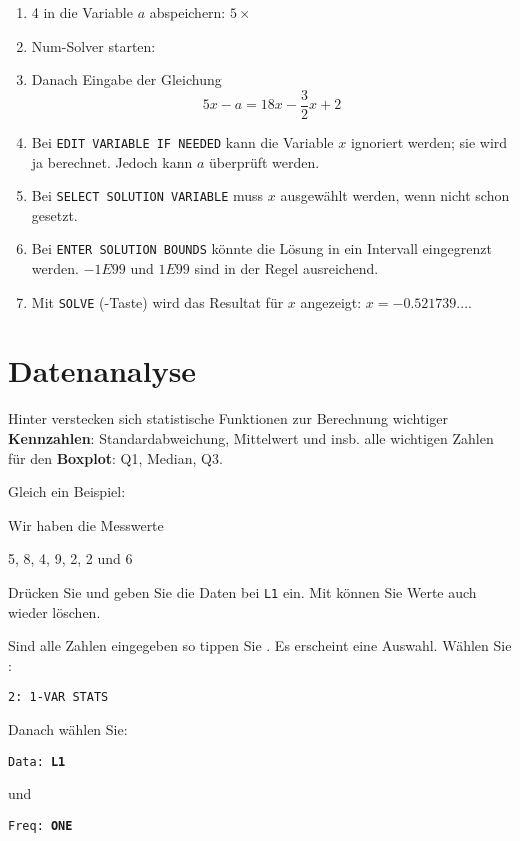 \begin{enumerate}
\item 4 in die Variable $a$ abspeichern:   $5\times$
\item Num-Solver starten:  
\item Danach Eingabe der Gleichung
$$5x-a = 18x -\frac32x + 2$$
\item Bei \texttt{EDIT VARIABLE IF NEEDED} kann die Variable $x$ ignoriert werden; sie wird ja berechnet. Jedoch kann $a$ überprüft werden.
\item Bei \texttt{SELECT SOLUTION VARIABLE} muss $x$ ausgewählt werden, wenn nicht schon gesetzt.
\item Bei \texttt{ENTER SOLUTION BOUNDS} könnte die Lösung in ein Intervall eingegrenzt werden. $-1E99$ und $1E99$ sind in der Regel ausreichend.
\item Mit \texttt{SOLVE} (-Taste) wird das Resultat für $x$ angezeigt: $x = -0.521739...$.
\end{enumerate}




\section{Datenanalyse}\label{daan}
Hinter  verstecken sich statistische
Funktionen zur Berechnung wichtiger \textbf{Kennzahlen}:
Standardabweichung, Mittelwert und insb. alle wichtigen Zahlen für
den \textbf{Boxplot}: Q1, Median, Q3.

Gleich ein Beispiel:

Wir haben die Messwerte

5, 8, 4, 9, 2, 2 und 6

Drücken Sie  und geben Sie die Daten
bei \texttt{L1} ein.
Mit  können Sie Werte auch wieder löschen.

Sind alle Zahlen eingegeben so tippen
Sie . Es erscheint eine
Auswahl. Wählen Sie :

\texttt{2: 1-VAR STATS}

Danach wählen Sie:

\texttt{Data: \textbf{L1}}

und

\texttt{Freq: \textbf{ONE}}

